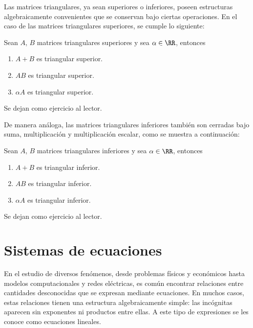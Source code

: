 Las matrices triangulares, ya sean superiores o inferiores, poseen estructuras algebraicamente convenientes que se conservan bajo ciertas operaciones. En el caso de las matrices triangulares superiores, se cumple lo siguiente:

\begin{theorem}{}{}
    Sean $A$, $B$ matrices triangulares superiores y sea $\alpha \in \RR$, entonces
    \begin{enumerate}[label=\roman*), topsep=6pt, itemsep=0pt]
        \item $A + B$ es triangular superior.
        \item $AB$ es triangular superior.
        \item $\alpha A$ es triangular superior.
    \end{enumerate}

    \tcblower
    \demostracion Se dejan como ejercicio al lector.
\end{theorem}

De manera análoga, las matrices triangulares inferiores también son cerradas bajo suma, multiplicación y multiplicación escalar, como se muestra a continuación:

\begin{theorem}{}{}
    Sean $A$, $B$ matrices triangulares inferiores y sea $\alpha \in \RR$, entonces
    \begin{enumerate}[label=\roman*), topsep=6pt, itemsep=0pt]
        \item $A + B$ es triangular inferior.
        \item $AB$ es triangular inferior.
        \item $\alpha A$ es triangular inferior.
    \end{enumerate}

    \tcblower
    \demostracion Se dejan como ejercicio al lector.
\end{theorem}

\section{Sistemas de ecuaciones}

En el estudio de diversos fenómenos, desde problemas físicos y económicos hasta modelos computacionales y redes eléctricas, es común encontrar relaciones entre cantidades desconocidas que se expresan mediante ecuaciones. En muchos casos, estas relaciones tienen una estructura algebraicamente simple: las incógnitas aparecen sin exponentes ni productos entre ellas. A este tipo de expresiones se les conoce como ecuaciones lineales.

